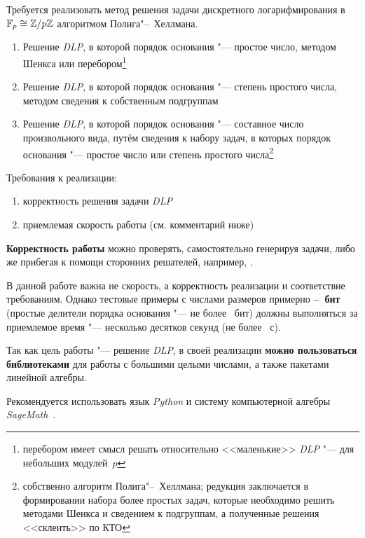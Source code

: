 \documentclass{ca-capstone}
\begin{document}


\goal
Требуется реализовать метод решения задачи дискретного логарифмирования в
$\mathbb{F}_{p} \cong \mathbb{Z}/p\mathbb{Z}$ алгоритмом Полига"--~Хеллмана.

\functionality
\begin{enumerate}
  \item Решение \emph{DLP}, в которой порядок основания "--- простое число, методом Шенкса или
    перебором\footnote{перебором имеет смысл решать относительно <<маленькие>> \emph{DLP} "--- для
    небольших модулей~$p$}
  \item Решение \emph{DLP}, в которой порядок основания "--- степень простого числа, методом
    сведения к собственным подгруппам
  \item Решение \emph{DLP}, в которой порядок основания "--- составное число произвольного вида,
    путём сведения к набору задач, в которых порядок основания "--- простое число или степень
    простого числа\footnote{собственно алгоритм Полига"--~Хеллмана; редукция заключается в
    формировании набора более простых задач, которые необходимо решить методами Шенкса и
    сведением к подгруппам, а полученные решения <<склеить>> по КТО}
\end{enumerate}

\requirements
Требования к реализации:
\begin{enumerate}
  \item корректность решения задачи \emph{DLP}
  \item приемлемая скорость работы (см. комментарий ниже)
\end{enumerate}

\textbf{Корректность работы} можно проверять, самостоятельно генерируя задачи, либо же
прибегая к помощи сторонних решателей, например, \cite{alpertron-dilog,sagemath}.

В данной работе важна не скорость, а корректность реализации и соответствие требованиям.
Однако тестовые примеры с числами размеров примерно \textbf{\ReqBitsMin--\ReqBitsMax~бит}
(простые делители порядка основания "--- не более \ReqQBitsMax~бит) должны выполняться за
приемлемое время "--- несколько десятков секунд (не более \ReqSeconds~с).

\details
Так как цель работы "--- решение \emph{DLP}, в своей реализации \textbf{можно пользоваться
библиотеками} для работы с большими целыми числами, а также пакетами линейной алгебры.

Рекомендуется использовать язык \emph{Python} и систему компьютерной алгебры
\emph{SageMath}~\cite{sagemath}.
\end{document}

